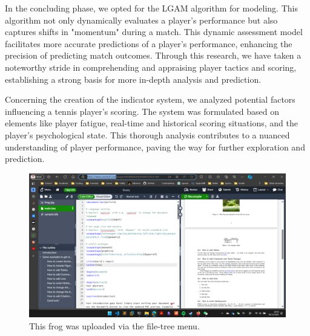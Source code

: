 \documentclass{article}
\begin{document}
In the concluding phase, we opted for the LGAM algorithm for modeling. This algorithm not only dynamically evaluates a player's performance but also captures shifts in "momentum" during a match. This dynamic assessment model facilitates more accurate predictions of a player's performance, enhancing the precision of predicting match outcomes. Through this research, we have taken a noteworthy stride in comprehending and appraising player tactics and scoring, establishing a strong basis for more in-depth analysis and prediction.

Concerning the creation of the indicator system, we analyzed potential factors influencing a tennis player's scoring. The system was formulated based on elements like player fatigue, real-time and historical scoring situations, and the player's psychological state. This thorough analysis contributes to a nuanced understanding of player performance, paving the way for further exploration and prediction.
\begin{figure}[h]
      \centering
      \includegraphics[width=0.25\linewidth]{test1.png}
      \caption{\label{fig:frog}This frog was uploaded via the file-tree menu.}
\end{figure}



\end{document}
